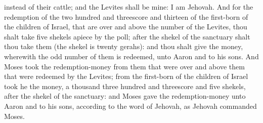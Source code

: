 instead of their cattle; and the Levites shall be mine: I am Jehovah. And for the redemption of the two hundred and threescore and thirteen of the first-born of the children of Israel, that are over and above the number of the Levites, thou shalt take five shekels apiece by the poll; after the shekel of the sanctuary shalt thou take them (the shekel is twenty gerahs): and thou shalt give the money, wherewith the odd number of them is redeemed, unto Aaron and to his sons. And Moses took the redemption-money from them that were over and above them that were redeemed by the Levites; from the first-born of the children of Israel took he the money, a thousand three hundred and threescore and five shekels, after the shekel of the sanctuary: and Moses gave the redemption-money unto Aaron and to his sons, according to the word of Jehovah, as Jehovah commanded Moses. 

